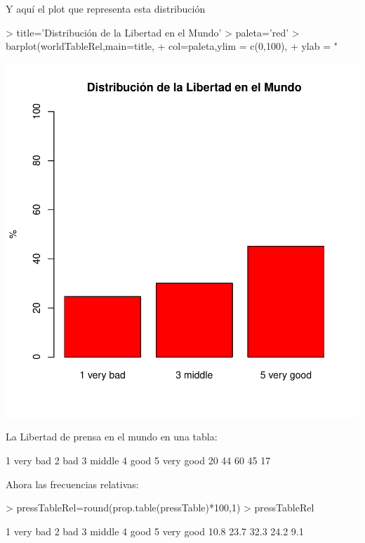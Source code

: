 \documentclass{article}
\begin{document}
Y aquí el plot que representa esta distribución
\begin{Schunk}
\begin{Sinput}
> title='Distribución de la Libertad en el Mundo'
> paleta='red'
> barplot(worldTableRel,main=title,
+         col=paleta,ylim = c(0,100),
+         ylab = "%
\end{Sinput}
\end{Schunk}
\includegraphics{paperVersion_0-worldTableRelPlot}


La Libertad de prensa en el mundo en una tabla:
\begin{Schunk}
\begin{Soutput}
 1 very bad       2 bad    3 middle      4 good 5 very good 
         20          44          60          45          17 
\end{Soutput}
\end{Schunk}


Ahora las frecuencias relativas:
\begin{Schunk}
\begin{Sinput}
> pressTableRel=round(prop.table(pressTable)*100,1)
> pressTableRel
\end{Sinput}
\begin{Soutput}
 1 very bad       2 bad    3 middle      4 good 5 very good 
       10.8        23.7        32.3        24.2         9.1 
\end{Soutput}
\end{Schunk}
\end{document}
